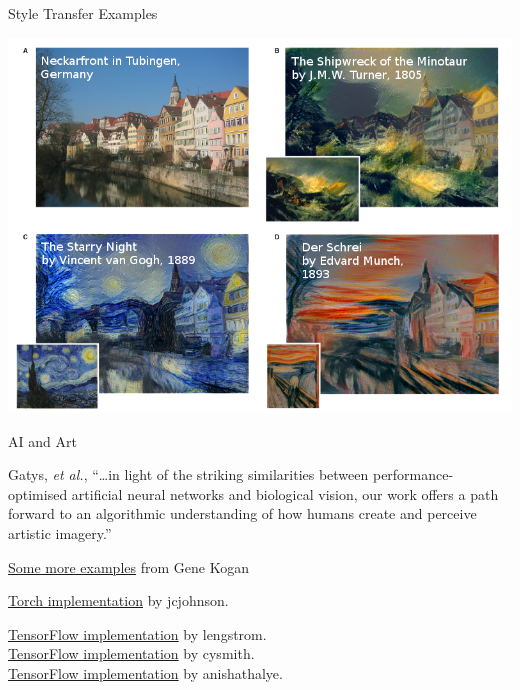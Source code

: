 \documentclass[12pt,t]{beamer}
\begin{document}
\begin{frame}{Style Transfer Examples}
 \centerline{
\includegraphics[height=0.9\textheight]{./images/gatys-exs.png} 
}

\end{frame}

\begin{frame}{AI and Art}

Gatys, {\it et al.}, ``\ldots in light of the striking similarities between performance-optimised artificial neural networks and biological vision, our work offers a path forward to an algorithmic understanding of how humans create and perceive artistic imagery.''

\bigskip
\href{http://genekogan.com/works/style-transfer/}{\color{blue}Some more examples} from Gene Kogan

\bigskip
\href{https://github.com/jcjohnson/neural-style}{\color{blue}Torch implementation} by jcjohnson.

\bigskip
\href{https://github.com/lengstrom/fast-style-transfer}{\color{blue}TensorFlow implementation} by lengstrom. \\
\href{https://github.com/cysmith/neural-style-tf}{\color{blue}TensorFlow implementation} by cysmith. \\
\href{https://github.com/anishathalye/neural-style}{\color{blue}TensorFlow implementation} by anishathalye. 

\end{frame}
\end{document}
